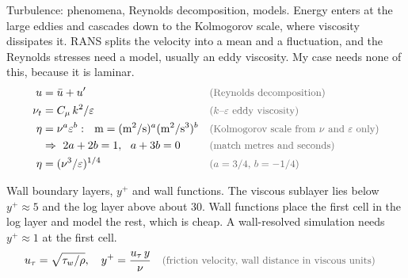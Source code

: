 \begin{qabox}{Turbulence: phenomena, Reynolds decomposition, models.}
\explain Energy enters at the large eddies and cascades down to the Kolmogorov scale, where
viscosity dissipates it. RANS splits the velocity into a mean and a fluctuation, and the Reynolds
stresses need a model, usually an eddy viscosity. My case needs none of this, because it is
laminar.
\derive
\begin{align*}
u &= \bar u + u' \why{Reynolds decomposition} \\
\nu_t &= C_\mu\,k^2/\varepsilon \why{$k$--$\varepsilon$ eddy viscosity} \\
\eta &= \nu^{a}\varepsilon^{b}:\ \ \mathrm{m} = (\mathrm{m^2/s})^{a}(\mathrm{m^2/s^3})^{b} \why{Kolmogorov scale from $\nu$ and $\varepsilon$ only} \\
&\Rightarrow\ 2a + 2b = 1,\ \ a + 3b = 0 \why{match metres and seconds} \\
\eta &= (\nu^3/\varepsilon)^{1/4} \why{$a = 3/4$, $b = -1/4$}
\end{align*}
\end{qabox}

\begin{qabox}{Wall boundary layers, $y^+$ and wall functions.}
\explain The viscous sublayer lies below $y^+ \approx 5$ and the log layer above about 30. Wall
functions place the first cell in the log layer and model the rest, which is cheap. A wall-resolved
simulation needs $y^+ \approx 1$ at the first cell.
\derive
\begin{align*}
u_\tau &= \sqrt{\tau_w/\rho},\quad y^+ = \frac{u_\tau\,y}{\nu} \why{friction velocity, wall distance in viscous units}
\end{align*}
\end{qabox}

